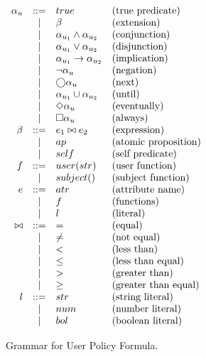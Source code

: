 \begin{table}[!ht]
    \centering
    $
    \begin{array}{rcll}
        \alpha_u   & ::=   & true              & \text{(true predicate)} \\
                & |     & \beta              & \text{(extension)} \\
                & |     & \alpha_{u_1} \land \alpha_{u_2} & \text{(conjunction)} \\
                & |     & \alpha_{u_1} \lor \alpha_{u_2}  & \text{(disjunction)} \\
                & |     & \alpha_{u_1} \rightarrow \alpha_{u_2} & \text{(implication)} \\
                & |     & \neg \alpha_u          & \text{(negation)} \\
                & |     & \bigcirc \alpha_u            & \text{(next)} \\
                & |     & \alpha_{u_1} \cup \alpha_{u_2}    & \text{(until)} \\
                & |     & \Diamond \alpha_u            & \text{(eventually)} \\
                & |     & \square \alpha_u            & \text{(always)} \\
        \beta    & ::=   & e_1 \bowtie e_2   & \text{(expression)} \\
                & |     & ap                & \text{(atomic proposition)} \\
                & |     & self              & \text{(self predicate)} \\
        f       & ::=   & user(str)           & \text{(user function)} \\
                & |     & subject()         & \text{(subject function)} \\
        e       & ::=   & atr               & \text{(attribute name)} \\
                & |     & f                 & \text{(functions)} \\
                & |     & l                 & \text{(literal)} \\
        \bowtie & ::=   & =                 & \text{(equal)} \\
                & |     & \neq              & \text{(not equal)} \\
                & |     & <                 & \text{(less than)} \\
                & |     & \leq              & \text{(less than equal)} \\
                & |     & >                 & \text{(greater than)} \\
                & |     & \geq              & \text{(greater than equal)} \\
        l       & ::=   & str               & \text{(string literal)} \\
                & |     & num               & \text{(number literal)} \\
                & |     & bol               & \text{(boolean literal)} \\
    \end{array}
    $
    \caption{Grammar for User Policy Formula.}
    \label{tab:pf-grammar-user}
\end{table}